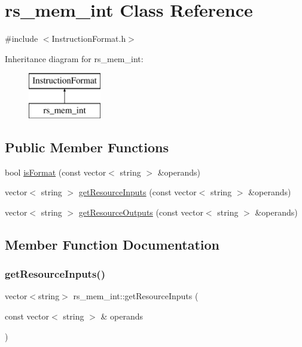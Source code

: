 \hypertarget{classrs__mem__int}{}\section{rs\+\_\+mem\+\_\+int Class Reference}
\label{classrs__mem__int}


{\ttfamily \#include $<$Instruction\+Format.\+h$>$}

Inheritance diagram for rs\+\_\+mem\+\_\+int\+:\begin{figure}[H]
\begin{center}
\leavevmode
\includegraphics[height=2.000000cm]{classrs__mem__int}
\end{center}
\end{figure}
\subsection*{Public Member Functions}
\begin{DoxyCompactItemize}
\item 
bool \hyperlink{classrs__mem__int_a49a72c354a4ff7e9dda94f75810de59f}{is\+Format} (const vector$<$ string $>$ \&operands)
\item 
vector$<$ string $>$ \hyperlink{classrs__mem__int_a3a1627ce0396aa81bc60b4f36e4f669f}{get\+Resource\+Inputs} (const vector$<$ string $>$ \&operands)
\item 
vector$<$ string $>$ \hyperlink{classrs__mem__int_a181c97b7f9f26c5a3d0b7fd7949628b4}{get\+Resource\+Outputs} (const vector$<$ string $>$ \&operands)
\end{DoxyCompactItemize}


\subsection{Member Function Documentation}
\mbox{\label{classrs__mem__int_a3a1627ce0396aa81bc60b4f36e4f669f}} 
\subsubsection{\texorpdfstring{get\+Resource\+Inputs()}{getResourceInputs()}}
{\footnotesize\ttfamily vector$<$string$>$ rs\+\_\+mem\+\_\+int\+::get\+Resource\+Inputs (\begin{DoxyParamCaption}\item[{const vector$<$ string $>$ \&}]{operands }\end{DoxyParamCaption})\hspace{0.3cm}{\ttfamily [virtual]}}

